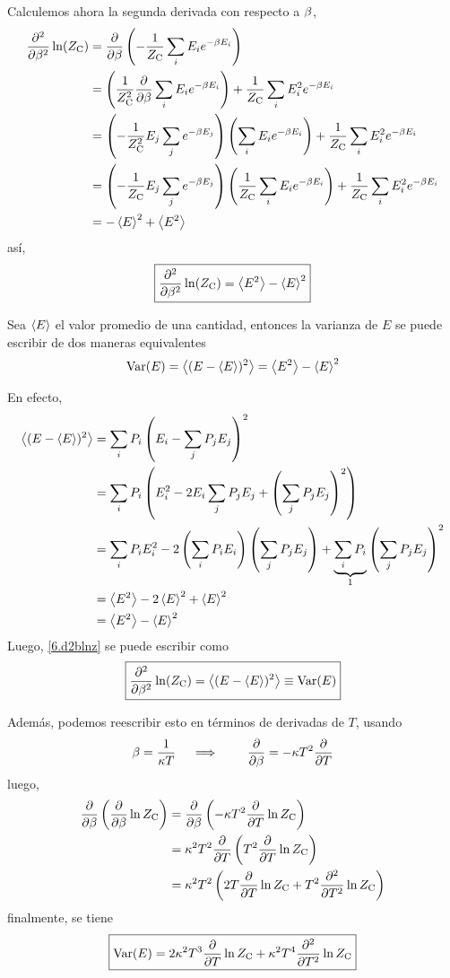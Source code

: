 Calculemos ahora la segunda derivada con respecto a $\beta$,
\begin{align}
  \pdv[2]{\b}\ln(\zc)&=\pdv{\b}\left(-\frac{1}{\zc}\sumi E_i\eb\right)\\
  &=\left(\frac{1}{\zc^2}\pdv{\b}\sumi E_i\eb\right)+\frac{1}{\zc}\sumi E_i^2\eb\\
  &=\left(-\frac{1}{\zc^2}E_j\sum_j e^{-\b E_j}\right)\left(\sumi E_i\eb\right)+\frac{1}{\zc}\sumi E_i^2\eb\\
  &=\left(-\frac{1}{\zc}E_j\sum_j e^{-\b E_j}\right)\left(\frac{1}{\zc}\sumi E_i\eb\right)+\frac{1}{\zc}\sumi E_i^2\eb\\
  &=-\ev{E}^2+\ev{E^2}
\end{align}
así,
\begin{equation}\label{6.d2blnz}
 \boxed{ \pdv[2]{\b}\ln(\zc)=\ev{E^2}-\ev{E}^2}
\end{equation}

\begin{prop}
Sea $\ev{E}$ el valor promedio de una cantidad, entonces la varianza de $E$ se puede escribir de dos maneras equivalentes
	\begin{equation}
  \text{Var}({E})=\ev{(E-\ev{E})^2}=\ev{E^2}-\ev{E}^2
\end{equation}
\end{prop}
En efecto,
\begin{align}
  \ev{(E-\ev{E})^2}&=\sumi P_i\left(E_i-\sumj P_j E_j\right)^2\\
  &=\sumi P_i\left(E_i^2-2E_i\sumj P_jE_j+\left(\sumj P_jE_j\right)^2\right)\\
  &=\sumi P_iE_i^2-2\left(\sumi P_iE_i\right)\left(\sumj P_jE_j\right)+\underbrace{\sumi P_i}_{1}\left(\sumj P_jE_j\right)^2\\
  &=\ev{E^2}-2\ev{E}^2+\ev{E}^2\\
  &=\ev{E^2}-\ev{E}^2
\end{align}
Luego, \eqref{6.d2blnz} se puede escribir como
\begin{equation}
  \boxed{\pdv[2]{\b}\ln(\zc)=\ev{(E-\ev{E})^2}\equiv \text{Var}(E)}
\end{equation}

Además, podemos reescribir esto en términos de derivadas de $T$, usando
\begin{equation}
  \beta=\frac{1}{\kappa T}\quad \implies \qquad \pdv{\beta}=-\kappa T^2\pdv{T}
\end{equation}
luego,
\begin{align}
  \pdv{\beta}\left(\pdv{\beta}\ln Z_{\rm C}\right)&=\pdv{\beta}\left(-\kappa T^2\pdv{T}\ln Z_{\rm C}\right)\\
  &=\kappa^2 T^2\pdv{T}\left(T^2\pdv{T}\ln Z_{\rm C}\right)\\
  &=\kappa^2T^2\left(2T\pdv{T}\ln Z_{\rm C}+T^2\pdv[2]{T}\ln Z_{\rm C}\right)
\end{align}
finalmente, se tiene
\begin{equation}
  \boxed{\text{Var}(E)=2\kappa^2T^3\pdv{T}\ln Z_{\rm C}+\kappa^2T^4\pdv[2]{T}\ln Z_{\rm C}}
\end{equation}








